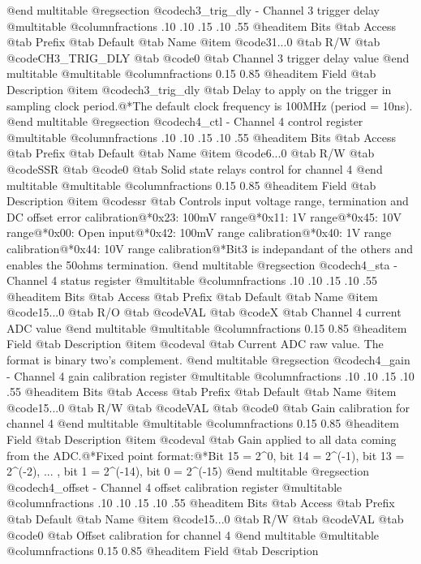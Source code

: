 @end multitable
@regsection @code{ch3_trig_dly} - Channel 3 trigger delay
@multitable @columnfractions .10 .10 .15 .10 .55
@headitem Bits @tab Access @tab Prefix @tab Default @tab Name
@item @code{31...0}
@tab R/W @tab
@code{CH3_TRIG_DLY}
@tab @code{0} @tab 
Channel 3 trigger delay value
@end multitable
@multitable @columnfractions 0.15 0.85
@headitem Field @tab Description
@item @code{ch3_trig_dly} @tab Delay to apply on the trigger in sampling clock period.@*The default clock frequency is 100MHz (period = 10ns).
@end multitable
@regsection @code{ch4_ctl} - Channel 4 control register
@multitable @columnfractions .10 .10 .15 .10 .55
@headitem Bits @tab Access @tab Prefix @tab Default @tab Name
@item @code{6...0}
@tab R/W @tab
@code{SSR}
@tab @code{0} @tab 
Solid state relays control for channel 4
@end multitable
@multitable @columnfractions 0.15 0.85
@headitem Field @tab Description
@item @code{ssr} @tab Controls input voltage range, termination and DC offset error calibration@*0x23: 100mV range@*0x11: 1V range@*0x45: 10V range@*0x00: Open input@*0x42: 100mV range calibration@*0x40: 1V range calibration@*0x44: 10V range calibration@*Bit3 is indepandant of the others and enables the 50ohms termination.
@end multitable
@regsection @code{ch4_sta} - Channel 4 status register
@multitable @columnfractions .10 .10 .15 .10 .55
@headitem Bits @tab Access @tab Prefix @tab Default @tab Name
@item @code{15...0}
@tab R/O @tab
@code{VAL}
@tab @code{X} @tab 
Channel 4 current ADC value
@end multitable
@multitable @columnfractions 0.15 0.85
@headitem Field @tab Description
@item @code{val} @tab Current ADC raw value. The format is binary two's complement.
@end multitable
@regsection @code{ch4_gain} - Channel 4 gain calibration register
@multitable @columnfractions .10 .10 .15 .10 .55
@headitem Bits @tab Access @tab Prefix @tab Default @tab Name
@item @code{15...0}
@tab R/W @tab
@code{VAL}
@tab @code{0} @tab 
Gain calibration for channel 4
@end multitable
@multitable @columnfractions 0.15 0.85
@headitem Field @tab Description
@item @code{val} @tab Gain applied to all data coming from the ADC.@*Fixed point format:@*Bit 15 = 2^0, bit 14 = 2^(-1), bit 13 = 2^(-2), ... , bit 1 = 2^(-14), bit 0 = 2^(-15)
@end multitable
@regsection @code{ch4_offset} - Channel 4 offset calibration register
@multitable @columnfractions .10 .10 .15 .10 .55
@headitem Bits @tab Access @tab Prefix @tab Default @tab Name
@item @code{15...0}
@tab R/W @tab
@code{VAL}
@tab @code{0} @tab 
Offset calibration for channel 4
@end multitable
@multitable @columnfractions 0.15 0.85
@headitem Field @tab Description
